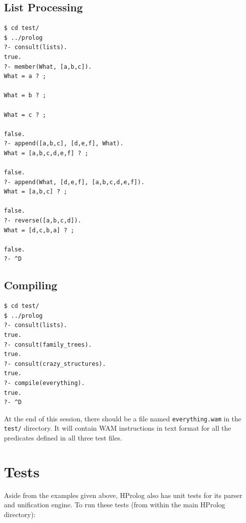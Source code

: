 \documentclass[11pt]{report}
\begin{document}
\subsection{List Processing}

\begin{verbatim}
$ cd test/
$ ../prolog
?- consult(lists).
true.
?- member(What, [a,b,c]).
What = a ? ;

What = b ? ;

What = c ? ;

false.
?- append([a,b,c], [d,e,f], What).
What = [a,b,c,d,e,f] ? ;

false.
?- append(What, [d,e,f], [a,b,c,d,e,f]).
What = [a,b,c] ? ;

false.
?- reverse([a,b,c,d]).
What = [d,c,b,a] ? ;

false.
?- ^D
\end{verbatim}

\subsection{Compiling}

\begin{verbatim}
$ cd test/
$ ../prolog
?- consult(lists).
true.
?- consult(family_trees).
true.
?- consult(crazy_structures).
true.
?- compile(everything).
true.
?- ^D
\end{verbatim}

At the end of this session, there should be a file named \texttt{everything.wam} in the \texttt{test/} directory. It will contain WAM instructions in text format for all the predicates defined in all three test files.


\section{Tests}

Aside from the examples given above, HProlog also has unit tests for its parser and unification engine. To run these tests (from within the main HProlog directory):
\end{document}
